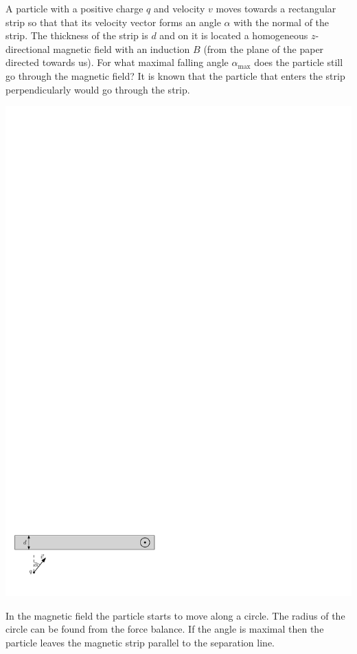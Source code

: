 A particle with a positive charge $q$ and velocity $v$ moves towards a rectangular strip so that that its velocity vector forms an angle $\alpha$ with the normal of the strip. The thickness of the strip is $d$ and on it is located a homogeneous $z$-directional magnetic field with an induction $B$ (from the plane of the paper directed towards us). For what maximal falling angle $\alpha_{\mathrm{max}}$ does the particle still go through the magnetic field? It is known that the particle that enters the strip perpendicularly would go through the strip.
\begin{center}
\includegraphics[width=\linewidth]{2013-lahg-02-magnetpeegeljoonis_ipe}
\end{center}

\hinteng
In the magnetic field the particle starts to move along a circle. The radius of the circle can be found from the force balance. If the angle is maximal then the particle leaves the magnetic strip parallel to the separation line.

